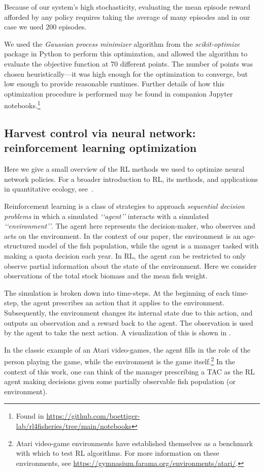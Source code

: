 \documentclass[floatfix,nofootinbib,longbibliography,notitlepage]{revtex4-2}
\begin{document}
Because of our system's high stochasticity, evaluating the mean episode reward afforded by any policy requires taking the average of many episodes and in our case we used 200 episodes. 

We used the \emph{Gaussian process minimizer} algorithm from the \emph{scikit-optimize} package in Python to perform this optimization, and allowed the algorithm to evaluate the objective function at 70 different points. 
The number of points was chosen heuristically—it was high enough for the optimization to converge, but low enough to provide reasonable runtimes. 
Further details of how this optimization procedure is performed may be found in companion Jupyter notebooks.\footnote{
Found in \url{https://github.com/boettiger-lab/rl4fisheries/tree/main/notebooks}
}

\subsection{Harvest control via neural network: reinforcement learning optimization}

Here we give a small overview of the RL methods we used to optimize neural network policies. 
For a broader introduction to RL, its methods, and applications in quantitative ecology, see~\cite{lapeyrolerie-rl}.

Reinforcement learning is a class of strategies to approach \emph{sequential decision problems} in which a simulated \emph{‘‘agent’’} interacts with a simulated \emph{‘‘environment’’}. 
The agent here represents the decision-maker, who observes and acts on the environment. 
In the context of our paper, the environment is an age-structured model of the fish population, while the agent is a manager tasked with making a quota decision each year. 
In RL, the agent can be restricted to only observe partial information about the state of the environment. 
Here we consider observations of the total stock biomass and the mean fish weight.

The simulation is broken down into time-steps. 
At the beginning of each time-step, the agent prescribes an action that it applies to the environment. 
Subsequently, the environment changes its internal state due to this action, and outputs an observation and a reward back to the agent. 
The observation is used by the agent to take the next action. A visualization of this is shown in \cite[Fig.~1]{lapeyrolerie-rl}.

In the classic example of an Atari video-games, the agent fills in the role of the person playing the game, while the environment is the game itself.\footnote{
Atari video-game environments have established themselves as a benchmark with which to test RL algorithms. For more information on these environments, see \url{https://gymnasium.farama.org/environments/atari/}.
}
In the context of this work, one can think of the manager prescribing a TAC as the RL agent making decisions given some partially observable fish population (or environment).
\end{document}
